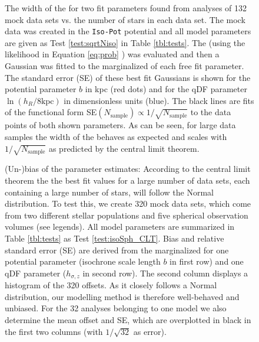 

\begin{figure}
\caption{The width of the \pdf{} for two fit parameters found from analyses of 132 mock data sets vs. the number of stars in each data set. The mock data was created in the \texttt{Iso-Pot} potential and all model parameters are given as Test \ref{test:sqrtNiso} in Table \ref{tbl:tests}. The \pdf{} (using the likelihood in Equation \ref{eq:prob} \Wilma{[TO DO: CHECK]}) was evaluated and then a Gaussian was fitted to the marginalized \pdf{} of each free fit parameter. The standard error (SE) of these best fit Gaussians is shown for the potential parameter $b$ in kpc (red dots) and for the qDF parameter $\ln(h_R/8\text{kpc})$ in dimensionless units (blue). The black lines are fits of the functional form SE$(N_\text{sample}) \propto 1/\sqrt{N_\text{sample}}$ to the data points of both shown parameters. As can be seen, for large data samples the width of the \pdf{} behaves as expected and scales with $1/\sqrt{N_\text{sample}}$ as predicted by the central limit theorem. } 
\label{fig:sqrtNiso}
\end{figure}




\begin{figure}
\caption{(Un-)bias of the parameter estimates: According to the central limit theorem the the best fit values for a large number of data sets, each containing a large number of stars, will follow the Normal distribution. To test this, we create 320 mock data sets, which come from two different stellar populations and five spherical observation volumes (see legends). All model parameters are summarized in Table \ref{tbl:tests} as Test \ref{test:isoSph_CLT}. Bias and relative standard error (SE) are derived from the marginalized \pdf{} for one potential parameter (isochrone scale length $b$ in first row) and one qDF parameter ($h_{\sigma,z}$ in second row). The second column displays a histogram of the 320 offsets. As it closely follows a Normal distribution, our modelling method is therefore well-behaved and unbiased. For the 32 analyses belonging to one model we also determine the mean offset and SE, which are overplotted in black in the first two columns (with $1/\sqrt{32}$ as error).   }
\label{fig:isoSph_CLT}
\end{figure}

